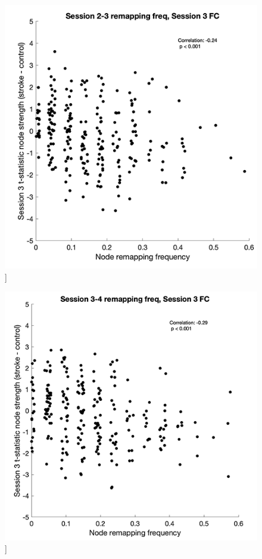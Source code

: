 \documentclass[phd,tocprelim]{cornell}
\renewcommand{\caption}[1]{\singlespacing\hangcaption{#1}\normalspacing}
\begin{document}
\null
\vfill
\clearpage
\null
\vfill
\begin{figure}[h!]
		\ContinuedFloat
		\captionsetup{labelformat=adja-page}
    \centering
    \includegraphics[width=\textwidth]{chapter1/SupplementaryFigure9D.png}
    \caption[]{}
\end{figure}
\null
\vfill
\clearpage
\null
\vfill
\begin{figure}[h!]
		\ContinuedFloat
		\captionsetup{labelformat=adja-page}
    \centering
    \includegraphics[width=\textwidth]{chapter1/SupplementaryFigure9E.png}
    \caption[]{}
\end{figure}
\end{document}
